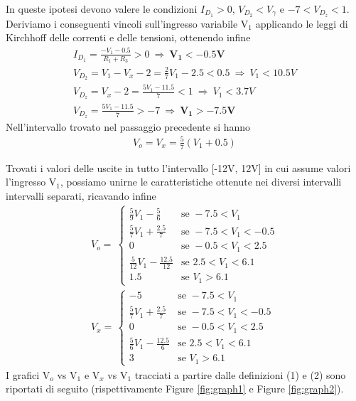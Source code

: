 \documentclass[a4paper,10pt]{article}
\begin{document}
\noindent In queste ipotesi devono valere le condizioni $I_{D_1}>0$, $V_{D_2}<V_{\gamma}$ e $-7<V_{D_z}<1$. Deriviamo i conseguenti vincoli sull'ingresso variabile V$_1$ applicando le leggi di Kirchhoff delle correnti e delle tensioni, ottenendo infine
	\begin{gather*}
		I_{D_1} = \frac{-V_1 - 0.5}{R_1+R_3} > 0 \ \Rightarrow \ \mathbf{V_{1} < -0.5V} \\
		V_{D_2} = V_1 - V_x -2 = \frac{2}{7}V_1 - 2.5 < 0.5  \ \Rightarrow \ V_1 < 10.5V \\
		V_{D_z} = V_x - 2 = \frac{5V_1 - 11.5}{7} < 1  \ \Rightarrow \ V_1<3.7V \\
		V_{D_z} = \frac{5V_1 - 11.5}{7} > -7 \ \Rightarrow \ \mathbf{V_1 > -7.5V}
	\end{gather*}
Nell'intervallo trovato nel passaggio precedente si hanno
	\begin{gather*}
		V_o = V_x = \frac{5}{7}(V_1 + 0.5)
	\end{gather*}
	
Trovati i valori delle uscite in tutto l'intervallo [-12V, 12V] in cui assume valori l'ingresso V$_1$, possiamo unirne le caratteristiche ottenute nei diversi intervalli intervalli separati, ricavando infine  
	\begin{gather}
	V_o =\ \begin{cases}	\frac{5}{9}V_1 - \frac{5}{6} & \mbox{se } -7.5 < V_1 \\ 
						\frac{5}{7}V_1 + \frac{2.5}{7} & \mbox{se } -7.5 < V_1 < -0.5 \\ 
						0 & \mbox{se } -0.5 < V_1 < 2.5 \\ 
						\frac{5}{12}V_1 - \frac{12.5}{12} & \mbox{se } 2.5 < V_1 < 6.1 \\ 
						1.5 & \mbox{se } V_1>6.1 
			   \end{cases} \\ 
  	V_x =\,\begin{cases}	-5 & \mbox{se } -7.5 < V_1 \\ 
						\frac{5}{7}V_1 + \frac{2.5}{7} & \mbox{se } -7.5 < V_1 < -0.5 \\ 
						0 & \mbox{se } -0.5 < V_1 < 2.5 \\ 
						\frac{5}{6}V_1 - \frac{12.5}{6} & \mbox{se } 2.5 < V_1 < 6.1 \\ 
						3 & \mbox{se } V_1>6.1 
			   \end{cases}
	\end{gather}
I grafici V$_o$ vs V$_1$ e V$_x$ vs V$_1$ tracciati a partire dalle definizioni (1) e (2) sono riportati di seguito (rispettivamente Figure \ref{fig:graph1} e Figure \ref{fig:graph2}).
\end{document}
